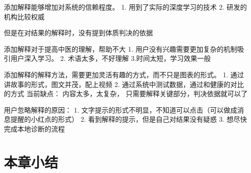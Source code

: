 添加解释能够增加对系统的信赖程度。
1. 用到了实际的深度学习的技术
2. 研发的机构比较权威

但是在对结果的解释时，没有提到体质判决的依据

添加解释对于提高中医的理解，帮助不大
1. 用户没有兴趣需要更加复杂的机制吸引用户深入学习。
2. 术语太多，不好理解
3.时间太短，学习效果一般

添加解释的解释方法，需要更加灵活有趣的方式，而不只是图表的形式。
1. 通过讲故事的形式，图文并茂，配上视频
2. 通过系统中测试数据，通过和健康的对比的方式
当前缺点： 内容太多，太复杂， 只需要解释关键部分，判决依据就可以了

用户忽略解释的原因：
1. 文字提示的形式不明显，不知道可以点击（可以做成消息提醒的小红点的形式）
2. 看到解释的提示，但是自己对结果没有疑惑
3. 想尽快完成本地诊断的流程


\section{本章小结}


